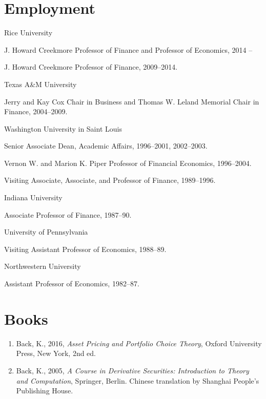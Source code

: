 \documentclass[margin, 11pt]{res}
\newenvironment{list1}{
  \begin{list}{}{%
            \setlength{\itemsep}{0in}
      \setlength{\parsep}{0in} \setlength{\parskip}{0in}
      \setlength{\topsep}{0in} \setlength{\partopsep}{0in}
      \setlength{\leftmargin}{0.2in}}}{\end{list}}
\newenvironment{list3}{
  \begin{list}{}{%
            \setlength{\itemsep}{0in}
      \setlength{\parsep}{0in} \setlength{\parskip}{0in}
      \setlength{\topsep}{0in} \setlength{\partopsep}{0in}
      \setlength{\leftmargin}{0.2in}}}{\vspace*{.15in}\end{list}}
\begin{document}
\begin{resume}
\section{\sc Employment}
\begin{list1}
\item Rice University
\begin{list3}
\item J. Howard Creekmore Professor of Finance and Professor of Economics, 2014 -- 
\item J. Howard Creekmore Professor of Finance, 2009--2014.
\end{list3}
\item Texas A\&M University
\begin{list3}
\item Jerry and Kay Cox Chair in Business and
Thomas W. Leland Memorial Chair in Finance, 2004--2009.
\end{list3}
\item Washington University in Saint Louis
\begin{list3}
\item Senior Associate Dean, Academic Affairs, 1996--2001, 2002--2003.
\item Vernon W. and Marion K. Piper Professor of Financial Economics, 1996--2004.
\item Visiting Associate, Associate, and Professor of Finance, 1989--1996.
\end{list3}
\item Indiana University
\begin{list3}
\item Associate Professor of Finance, 1987--90.
\end{list3}
\item University of Pennsylvania
\begin{list3}
\item Visiting Assistant Professor of
Economics, 1988--89.
\end{list3}
\item Northwestern University
\begin{list3}
\item Assistant Professor of
Economics, 1982--87.
\end{list3}
\vspace*{-.15in}
\end{list1}

\section{\sc Books}
\begin{enumerate}
\item Back, K., 2016, \textit{Asset Pricing and Portfolio Choice Theory}, Oxford University Press, New York,  2nd ed.
\item Back, K., 2005, \textit{A Course in Derivative Securities: Introduction to Theory and Computation}, Springer, Berlin.  Chinese translation by Shanghai People's Publishing House.
\end{enumerate}


\end{resume}
\end{document}
